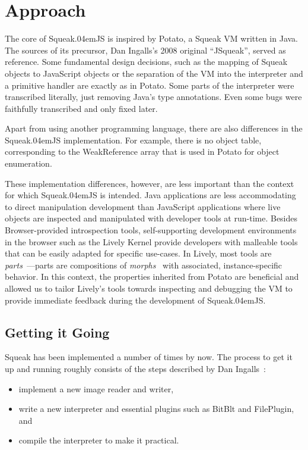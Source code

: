 \documentclass[natbib]{sigplanconf}
\newcommand*\SqueakJS{Squeak\texorpdfstring{\kern.04em}{}JS\xspace}
\newcommand*\JS{JavaScript\xspace}
\begin{document}
\section{Approach}
\label{sec:approach}

The core of \SqueakJS is inspired by Potato, a Squeak \ac{VM} written
in Java. The sources of its precursor, Dan Ingalls's 2008 original ``JSqueak'',
served as reference. Some fundamental design decisions, such as the mapping of Squeak
objects to \JS objects or the separation of the VM into the interpreter
and a primitive handler are exactly as in Potato. Some parts of the
interpreter were transcribed literally, just removing Java's type
annotations. Even some bugs were faithfully transcribed and only fixed later.

Apart from using another programming language, there are also differences in the
\SqueakJS implementation. For example, there is no object table,
corresponding to the WeakReference array that is used in Potato for
object enumeration.

These implementation differences, however, are less important than the
context for which \SqueakJS is intended. Java applications are less
accommodating to direct manipulation development than \JS applications
where live objects are inspected and manipulated with developer tools
at run-time. Besides Browser-provided introspection tools,
self-supporting development environments in the browser such as the
Lively Kernel provide developers with malleable tools that can be
easily adapted for specific use-cases. In Lively, most tools are
\emph{parts}~\cite{lincke2012lively}---parts are compositions of
\emph{morphs}~\cite{maloney1995morphic} with associated,
instance-specific behavior. In this context, the properties inherited
from Potato are beneficial and allowed us to tailor Lively's tools
towards inspecting and debugging the \ac{VM} to provide immediate
feedback during the development of \SqueakJS.

\subsection{Getting it Going}
\label{sec:getting-it-going}

Squeak has been implemented a number of times by now. The
process to get it up and running roughly consists of the steps
described by Dan Ingalls~\cite{IngallsKaehlerMaloneyWallaceKay97}:

\begin{itemize}
\item implement a new image reader and writer,
\item write a new interpreter and essential plugins such as BitBlt
and FilePlugin, and
\item compile the interpreter to make it practical.
\end{itemize}
\end{document}
